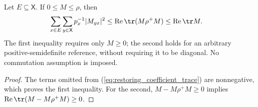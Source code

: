 \begin{theorem}
\label{thm:restoring_coefficient_bound}
\leanok
Let $E\subseteq\mathsf X$. If $0\le M\le\rho$, then
\begin{align}
\sum_{x\in E}\sum_{y\in\mathsf X}p_x^{-1}|M_{yx}|^2
  &\le\operatorname{Re}\tr(M\rho^+M)
   \le\operatorname{Re}\tr M.
\label{eq:restoring_selected_bound}
\end{align}
The first inequality requires only $M\ge0$; the second holds for an
arbitrary positive-semidefinite reference, without requiring it to be
diagonal. No commutation assumption is imposed.
\end{theorem}
\begin{proof}
\leanok
{}
The terms omitted from (\ref{eq:restoring_coefficient_trace}) are
nonnegative, which proves the first inequality.
For the second, $M-M\rho^+M\ge0$ implies
$\operatorname{Re}\tr(M-M\rho^+M)\ge0$.
\end{proof}
